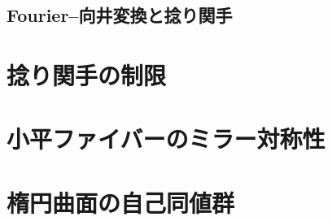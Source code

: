 \documentclass[uplatex,a4paper,dvipdfmx]{jsarticle}
\theoremstyle{plain}
\theoremstyle{definition}
\begin{document}
\subsection{Fourier--向井変換と捻り関手}
\section{捻り関手の制限}
\section{小平ファイバーのミラー対称性}
\section{楕円曲面の自己同値群}




\end{document}
